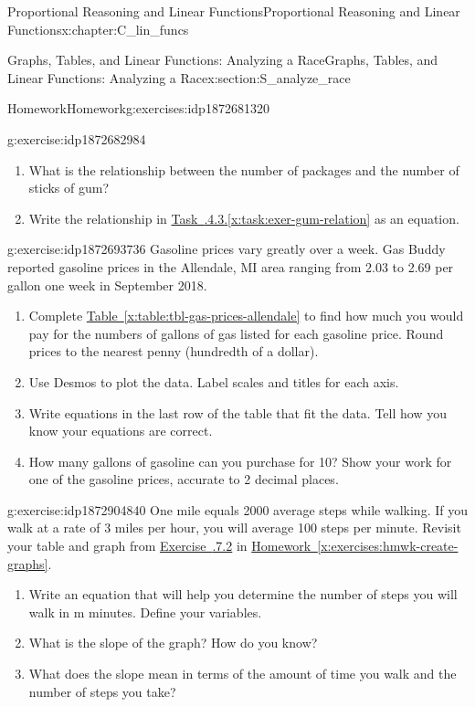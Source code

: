 \documentclass[oneside,10pt,]{book}
\newcommand{\xreffont}{\relax}
\numberwithin{equation}{chapter}
\begin{document}
\begin{chapterptx}{Proportional Reasoning and Linear Functions}{}{Proportional Reasoning and Linear Functions}{}{}{x:chapter:C_lin_funcs}
\begin{sectionptx}{Graphs, Tables, and Linear Functions: Analyzing a Race}{}{Graphs, Tables, and Linear Functions: Analyzing a Race}{}{}{x:section:S_analyze_race}
\begin{exercises-subsection}{Homework}{}{Homework}{}{}{g:exercises:idp1872681320}
\begin{divisionexercise}{3}{}{}{g:exercise:idp1872682984}
\begin{enumerate}[font=\bfseries,label=(\alph*),ref=\alph*]
\item\label{x:task:exer-gum-relation}What is the relationship between the number of packages and the number of sticks of gum?%
\item{}Write the relationship in \hyperref[x:task:exer-gum-relation]{Task~{\xreffont 2.4.4.3}.{\xreffont\ref{x:task:exer-gum-relation}}} as an equation.%
\end{enumerate}
\end{divisionexercise}%
\begin{divisionexercise}{4}{}{}{g:exercise:idp1872693736}%
Gasoline prices vary greatly over a week. Gas Buddy reported gasoline prices in the Allendale, MI area ranging from \textdollar{}2.03 to \textdollar{}2.69 per gallon one week in September 2018.%
\begin{enumerate}[font=\bfseries,label=(\alph*),ref=\alph*]
\item{}Complete \hyperref[x:table:tbl-gas-prices-allendale]{Table~{\xreffont\ref{x:table:tbl-gas-prices-allendale}}} to find how much you would pay for the numbers of gallons of gas listed for each gasoline price. Round prices to the nearest penny (hundredth of a dollar).%
\item{}Use Desmos to plot the data. Label scales and titles for each axis.%
\item{}Write equations in the last row of the table that fit the data. Tell how you know your equations are correct.%
\item{}How many gallons of gasoline can you purchase for \textdollar{}10?  Show your work for one of the gasoline prices, accurate to 2 decimal places.%
\end{enumerate}
\end{divisionexercise}%
\begin{divisionexercise}{5}{}{}{g:exercise:idp1872904840}%
One mile equals 2000 average steps while walking. If you walk at a rate of 3 miles per hour, you will average 100 steps per minute. \footnotemark{} Revisit your table and graph from \hyperlink{x:exercise:exer-walking-22}{Exercise~{\xreffont 2.2.7.2}} in \hyperref[x:exercises:hmwk-create-graphs]{Homework~{\xreffont\ref{x:exercises:hmwk-create-graphs}}}.%
\begin{enumerate}[font=\bfseries,label=(\alph*),ref=\alph*]
\item{}Write an equation that will help you determine the number of steps you will walk in m minutes. Define your variables.%
\item{}What is the slope of the graph? How do you know?%
\item{}What does the slope mean in terms of the amount of time you walk and the number of steps you take?%

\end{enumerate}
\end{divisionexercise}
\end{exercises-subsection}
\end{sectionptx}
\end{chapterptx}
\end{document}
